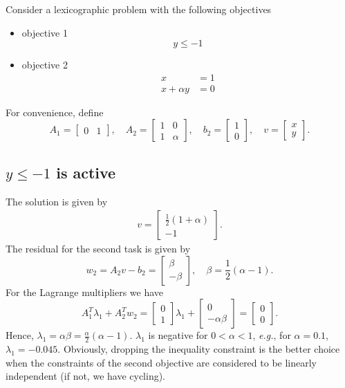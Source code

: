 \documentclass[12pt]{article}
\begin{document}
Consider a lexicographic problem with the following objectives
%
\begin{itemize}
  \item objective 1
    \[
    y \leq -1
    \]

  \item objective 2
    \begin{align*}
    x &= 1 \nonumber \\
    x + \alpha y &= 0 \nonumber
    \end{align*}
\end{itemize}
%
For convenience, define
%
\[
A_1 = \begin{bmatrix} 0 & 1 \end{bmatrix}, \quad
A_2 = \begin{bmatrix} 1 & 0 \\ 1 & \alpha \end{bmatrix}, \quad
b_2 = \begin{bmatrix} 1 \\ 0 \end{bmatrix}, \quad
v = \begin{bmatrix} x \\ y \end{bmatrix}.
\]

\subsection{$y \leq -1$ is active}

The solution is given by
%
\begin{align} \label{eq.solution}
v = \begin{bmatrix} \frac{1}{2}(1+\alpha) \\ -1 \end{bmatrix}.
\end{align}
%
%
The residual for the second task is given by
%
\[
w_2 = A_2 v - b_2 =
\begin{bmatrix} \beta \\ -\beta \end{bmatrix}, \quad \beta = \frac{1}{2}(\alpha-1).
\]
%
For the Lagrange multipliers we have
\[
A_1^T\lambda_1 + A_2^Tw_2 =
\begin{bmatrix} 0 \\ 1 \end{bmatrix}\lambda_1 +
\begin{bmatrix} 0 \\ -\alpha\beta \end{bmatrix} =
\begin{bmatrix} 0 \\ 0 \end{bmatrix}.
\]
%
Hence, $\lambda_1 = \alpha\beta = \frac{\alpha}{2}(\alpha-1)$. $\lambda_1$ is negative for $0 <
\alpha < 1$, \emph{e.g.}, for $\alpha = 0.1$, $\lambda_1 = -0.045$. Obviously, dropping the
inequality constraint is the better choice when the constraints of the second objective are
considered to be linearly independent (if not, we have cycling).
\end{document}
